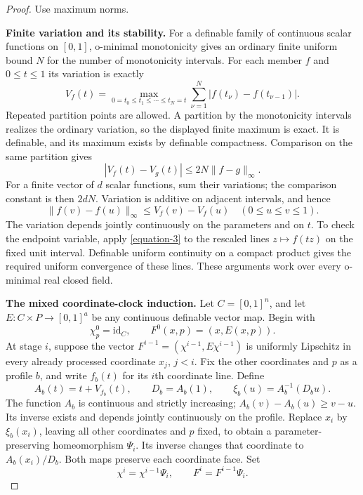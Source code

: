 \documentclass[11pt,a4paper]{article}
\theoremstyle{definition}
\begin{document}
\begin{proof}
Use maximum norms.

\textbf{Finite variation and its stability.}\quad
For a definable family of continuous scalar functions on
$[0,1]$, o-minimal monotonicity gives an ordinary finite
uniform bound $N$ for the number of monotonicity intervals.
For each member $f$ and $0\le t\le1$ its variation is exactly
\begin{equation}
 V_f(t)=
 \max_{0=t_0\le t_1\le\cdots\le t_N=t}
       \sum_{\nu=1}^N|f(t_\nu)-f(t_{\nu-1})|.
 \label{equation-2}
\end{equation}
Repeated partition points are allowed. A partition by the
monotonicity intervals realizes the ordinary variation, so
the displayed finite maximum is exact. It is definable,
and its maximum exists by definable compactness. Comparison
on the same partition gives
\begin{equation}
 |V_f(t)-V_g(t)|\le2N\|f-g\|_\infty.
 \label{equation-3}
\end{equation}
For a finite vector of $d$ scalar functions, sum their
variations; the comparison constant is then $2dN$.
Variation is additive on adjacent intervals, and hence
\begin{equation}
 \|f(v)-f(u)\|_\infty\le V_f(v)-V_f(u)
 \quad(0\le u\le v\le1).
 \label{equation-4}
\end{equation}
The variation depends jointly continuously on the parameters
and on $t$. To check the endpoint variable, apply \eqref{equation-3}
to the rescaled lines $z\mapsto f(tz)$ on the fixed unit
interval. Definable uniform continuity on a compact product
gives the required uniform convergence of these lines.
These arguments work over every o-minimal real closed field.

\textbf{The mixed coordinate-clock induction.}\quad
Let $C=[0,1]^n$, and let
$E:C\times P\to[0,1]^a$ be any continuous definable vector
map. Begin with
\[
 \chi^0_p=\mathrm{id}_C,\qquad
 F^0(x,p)=(x,E(x,p)).
\]
At stage $i$, suppose the vector
$F^{i-1}=(\chi^{i-1},E\chi^{i-1})$ is uniformly Lipschitz
in every already processed coordinate $x_j$, $j<i$.
Fix the other coordinates and $p$ as a profile $b$, and
write $f_b(t)$ for its $i$th coordinate line. Define
\begin{equation}
 A_b(t)=t+V_{f_b}(t),\qquad
 D_b=A_b(1),\qquad
 \xi_b(u)=A_b^{-1}(D_bu).
 \label{equation-5}
\end{equation}
The function $A_b$ is continuous and strictly increasing;
$A_b(v)-A_b(u)\ge v-u$. Its inverse exists and depends
jointly continuously on the profile. Replace $x_i$ by
$\xi_b(x_i)$, leaving all other coordinates and $p$ fixed,
to obtain a parameter-preserving homeomorphism $\Psi_i$.
Its inverse changes that coordinate to $A_b(x_i)/D_b$.
Both maps preserve each coordinate face. Set
\[
 \chi^i=\chi^{i-1}\Psi_i,\qquad
 F^i=F^{i-1}\Psi_i.
\]


\end{proof}
\end{document}
